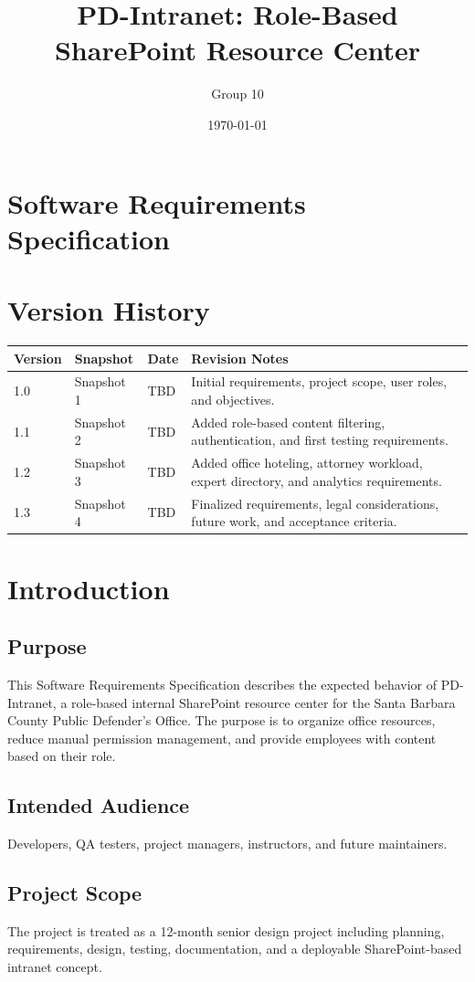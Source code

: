 \documentclass[12pt]{article}
\title{PD-Intranet: Role-Based SharePoint Resource Center}
\author{Group 10}
\date{\today}
\begin{document}
\maketitle
\tableofcontents
\newpage

\section{Software Requirements Specification}
\section{Version History}
\begin{longtable}{|p{1in}|p{1.3in}|p{1.4in}|p{2.6in}|}\hline
Version & Snapshot & Date & Revision Notes \\ \hline
1.0 & Snapshot 1 & TBD & Initial requirements, project scope, user roles, and objectives. \\ \hline
1.1 & Snapshot 2 & TBD & Added role-based content filtering, authentication, and first testing requirements. \\ \hline
1.2 & Snapshot 3 & TBD & Added office hoteling, attorney workload, expert directory, and analytics requirements. \\ \hline
1.3 & Snapshot 4 & TBD & Finalized requirements, legal considerations, future work, and acceptance criteria. \\ \hline
\end{longtable}

\section{Introduction}
\subsection{Purpose}
This Software Requirements Specification describes the expected behavior of PD-Intranet, a role-based internal SharePoint resource center for the Santa Barbara County Public Defender's Office. The purpose is to organize office resources, reduce manual permission management, and provide employees with content based on their role.

\subsection{Intended Audience}
Developers, QA testers, project managers, instructors, and future maintainers.

\subsection{Project Scope}
The project is treated as a 12-month senior design project including planning, requirements, design, testing, documentation, and a deployable SharePoint-based intranet concept.
\end{document}
